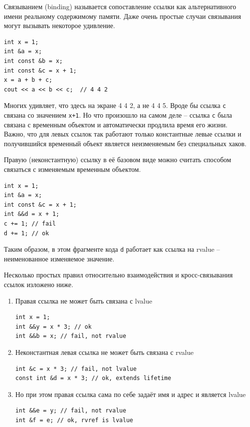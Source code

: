 \documentclass[a4paper,12pt,oneside]{article}
\begin{document}
Связыванием (binding) называется сопоставление ссылки как альтернативного имени реальному содержимому памяти. Даже очень простые случаи связывания могут вызывать некоторое удивление.

\begin{lstlisting}
int x = 1;
int &a = x;
int const &b = x;
int const &c = x + 1;
x = a + b + c;
cout << a << b << c;  // 4 4 2
\end{lstlisting}

Многих удивляет, что здесь на экране 4 4 2, а не 4 4 5. Вроде бы ссылка \lstinline!c! связана со значением \lstinline!x+1!. Но что произошло на самом деле -- ссылка \lstinline!c! была связана с временным объектом и автоматически продлила время его жизни. Важно, что для левых ссылок так работают только константные левые ссылки и получившийся временный объект является неизменяемым без специальных хаков.

Правую (неконстантную) ссылку в её базовом виде можно считать способом связаться с изменяемым временным объектом.

\begin{lstlisting}
int x = 1;
int &a = x;
int const &c = x + 1;
int &&d = x + 1;
c += 1; // fail
d += 1; // ok
\end{lstlisting}

Таким образом, в этом фрагменте кода \lstinline!d! работает как ссылка на rvalue -- неименованное изменяемое значение.

Несколько простых правил относительно взаимодействия и кросс-связывания ссылок изложено ниже.

\begin{enumerate}
\item
Правая ссылка не может быть связана с lvalue
\begin{lstlisting}
int x = 1; 
int &&y = x * 3; // ok
int &&b = x; // fail, not rvalue 
\end{lstlisting}
\item
Неконстантная левая ссылка не может быть связана с rvalue
\begin{lstlisting}
int &c = x * 3; // fail, not lvalue
const int &d = x * 3; // ok, extends lifetime
\end{lstlisting}
\item
Но при этом правая ссылка сама по себе задаёт имя и адрес и является lvalue
\begin{lstlisting}
int &&e = y; // fail, not rvalue
int &f = e; // ok, rvref is lvalue
\end{lstlisting}
\end{enumerate}
\end{document}
